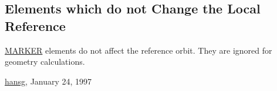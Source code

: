 \subsection{Elements which do not Change the Local Reference}\href{marker.html}{MARKER} elements do not  affect the reference orbit. They are ignored for geometry calculations.  

\href{http://www.cern.ch/Hans.Grote/hansg_sign.html}{hansg}, January 24, 1997 



%
%
%
%
%
%
%
%
%
%
